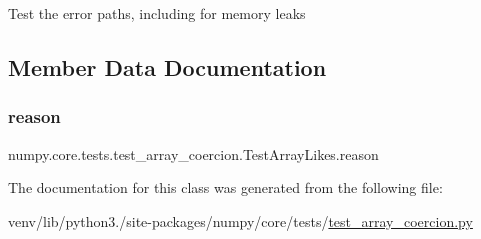 \begin{DoxyVerb}Test the error paths, including for memory leaks\end{DoxyVerb}
 

\subsection{Member Data Documentation}
\mbox{\label{classnumpy_1_1core_1_1tests_1_1test__array__coercion_1_1TestArrayLikes_a2d2e4efce21d64e25709ad22d48c0a24}} 
\subsubsection{\texorpdfstring{reason}{reason}}
{\footnotesize\ttfamily numpy.\+core.\+tests.\+test\+\_\+array\+\_\+coercion.\+Test\+Array\+Likes.\+reason\hspace{0.3cm}{\ttfamily [static]}}



The documentation for this class was generated from the following file\+:\begin{DoxyCompactItemize}
\item 
venv/lib/python3./site-\/packages/numpy/core/tests/\hyperlink{test__array__coercion_8py}{test\+\_\+array\+\_\+coercion.\+py}\end{DoxyCompactItemize}
